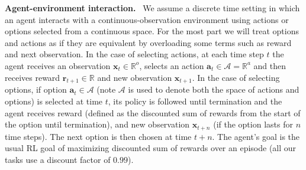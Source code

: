 \documentclass[nohyperref]{article}
\theoremstyle{plain}
\theoremstyle{definition}
\theoremstyle{remark}
\renewcommand{\paragraph}[1]{\textbf{#1}\ }
\newcommand{\obs}{\mathbf{x}}
\newcommand{\obsspace}{\mathbb{R}^o}
\newcommand{\action}{\mathbf{a}}
\newcommand{\actionspace}{\mathcal{A}}
\newcommand{\rew}{\mathbf{r}}
\begin{document}
\paragraph{Agent-environment interaction.}
We assume a discrete time setting  in which an agent interacts with a continuous-observation environment using actions or options selected from a continuous space. For the most part we will treat options and actions as if they are equivalent by overloading some terms such as reward and next observation. In the case of selecting actions, at each time step $t$ the agent receives an observation $\obs_t \in \obsspace$, selects an action $\action_t \in \actionspace = \mathbb{R}^{a}$ and then receives reward $\rew_{t+1} \in \mathbb{R}$ and new observation $\obs_{t+1}$. In the case of selecting options, if option $\action_t \in \actionspace$ (note $\actionspace$ is used to denote both the space of actions and options) is selected at time $t$, its policy is followed until termination and the agent receives reward (defined as the discounted sum of rewards from the start of the option until termination), and new observation  $\obs_{t+n}$ (if the option lasts for $n$ time steps). The next option is then chosen at time $t+n$. The agent's goal is the usual RL goal of maximizing discounted sum of rewards over an episode (all our tasks use a discount factor of $0.99$).

\end{document}

